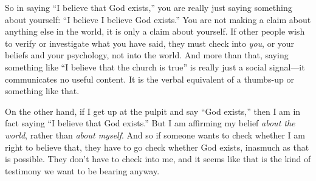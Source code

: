 		So in saying ``I believe that God exists,'' you are really just saying something about yourself: ``I believe I believe God exists.'' You are not making a claim about anything else in the world, it is only a claim about yourself. If other people wish to verify or investigate what you have said, they must check into \textit{you}, or your beliefs and your psychology, not into the world. And more than that, saying something like ``I believe that the church is true'' is really just a social signal---it communicates no useful content. It is the verbal equivalent of a thumbs-up or something like that.
		
		On the other hand, if I get up at the pulpit and say ``God exists,'' then I am in fact saying ``I believe that God exists.'' But I am affirming my belief \textit{about the world}, rather than \textit{about myself}. And so if someone wants to check whether I am right to believe that, they have to go check whether God exists, inasmuch as that is possible. They don't have to check into me, and it seems like that is the kind of testimony we want to be bearing anyway.